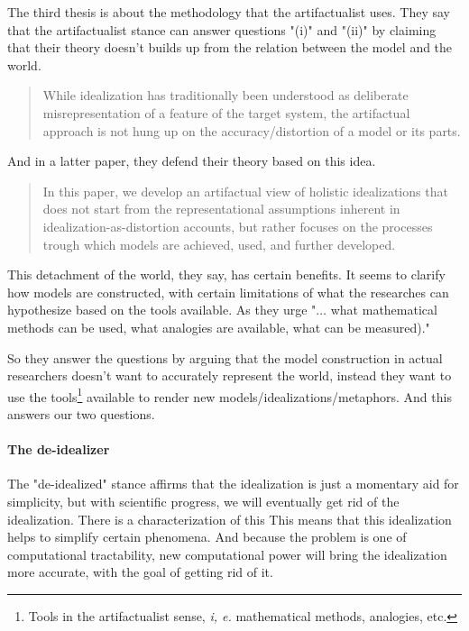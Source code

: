 {{The third thesis is about the methodology that the artifactualist uses.
They say that the artifactualist stance can answer questions "(i)" and "(ii)" by claiming that their theory doesn't builds up from the relation between the model and the world.

\begin{quote}
	While idealization has traditionally been understood as deliberate misrepresentation of a feature of the target system, the artifactual  approach is not hung up on the accuracy/distortion of a model or its parts. %
\end{quote}

And in a latter paper, they defend their theory based on this idea.

\begin{quote}
	In this paper, we develop an artifactual view of holistic idealizations that does not start from the representational assumptions inherent in idealization-as-distortion accounts, but rather focuses on the processes trough which models are achieved, used, and further developed. %
\end{quote}

This detachment of the world, they say, has certain benefits.
It seems to clarify how models are constructed, with certain limitations of what the researches can hypothesize based on the tools available.
As they urge "$\ldots$ what  mathematical methods can be used, what analogies are available, what can be measured)." %

So they answer the questions by arguing that the model construction in actual researchers doesn't want to accurately represent the world, instead they want to use the tools\footnote{Tools in the artifactualist sense, \emph{i, e.} mathematical methods, analogies, etc.} available to render new models/idealizations/metaphors.
And this answers our two questions.

\paragraph{The de-idealizer}

The "de-idealized" stance affirms that the idealization is just a momentary aid for simplicity, but with scientific progress, we will eventually get rid of the idealization.
There is a characterization of this %
This means that this idealization helps to simplify certain phenomena.
And because the problem is one of computational tractability, new computational power will bring the idealization more accurate, with the goal of getting rid of it.

}}

